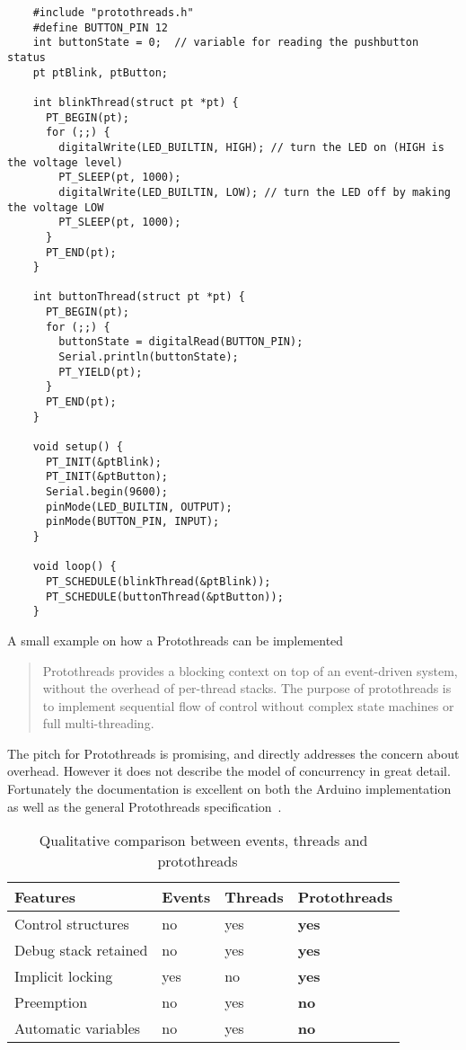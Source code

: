 \begin{listing}[htb!]
  \centering
  \begin{verbatim}
    #include "protothreads.h"
    #define BUTTON_PIN 12
    int buttonState = 0;  // variable for reading the pushbutton status
    pt ptBlink, ptButton;

    int blinkThread(struct pt *pt) {
      PT_BEGIN(pt);
      for (;;) {
        digitalWrite(LED_BUILTIN, HIGH); // turn the LED on (HIGH is the voltage level)
        PT_SLEEP(pt, 1000);
        digitalWrite(LED_BUILTIN, LOW); // turn the LED off by making the voltage LOW
        PT_SLEEP(pt, 1000);
      }
      PT_END(pt);
    }

    int buttonThread(struct pt *pt) {
      PT_BEGIN(pt);
      for (;;) {
        buttonState = digitalRead(BUTTON_PIN);
        Serial.println(buttonState);
        PT_YIELD(pt);
      }
      PT_END(pt);
    }

    void setup() {
      PT_INIT(&ptBlink);
      PT_INIT(&ptButton);
      Serial.begin(9600);
      pinMode(LED_BUILTIN, OUTPUT);
      pinMode(BUTTON_PIN, INPUT);
    }

    void loop() {
      PT_SCHEDULE(blinkThread(&ptBlink));
      PT_SCHEDULE(buttonThread(&ptButton));
    }
  \end{verbatim}
  \caption{A small example on how a Protothreads can be implemented}
  \label{lst:protothreadsexample}
\end{listing}


\blockcquote{Artin2020, AdamDunkelProtothreads}{Protothreads provides a blocking context on top of an event-driven system, without the overhead of per-thread stacks. The purpose of protothreads is to implement sequential flow of control without complex state machines or full multi-threading.}

The pitch for Protothreads is promising, and directly addresses the concern about overhead. However it does not describe the model of concurrency in great detail. Fortunately the documentation is excellent on both the Arduino implementation~\cite{Artin2020} as well as the general Protothreads specification~\cite{AdamDunkelProtothreads}.


\begin{table}[htb!]
  \centering
  \begin{tabular}{lll>{\bfseries}l}
    \toprule
    Features             & Events & Threads & Protothreads \\ \midrule
    Control structures   & no     & yes     & yes          \\
    Debug stack retained & no     & yes     & yes          \\
    Implicit locking     & yes    & no      & yes          \\
    Preemption           & no     & yes     & no           \\
    Automatic variables  & no     & yes     & no
  \end{tabular}
  \caption{Qualitative comparison between events, threads and protothreads ~\cite{dunkels05using}}
  \label{tab:protothreadscomparison}
\end{table}


